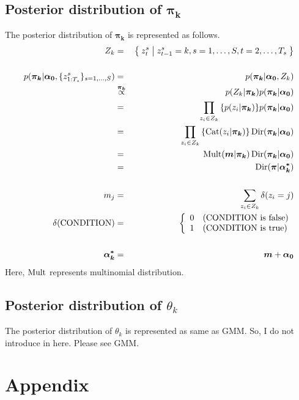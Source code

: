 \documentclass[a4paper]{article}
\DeclareMathOperator{\Cat}{\rm Cat}
\DeclareMathOperator{\Mult}{\rm Mult}
\DeclareMathOperator{\Dir}{\rm Dir}
\newcommand{\proptoas}[1]{\overset{#1}{\propto}}
\begin{document}
	\subsection{Posterior distribution of $\boldsymbol{\pi_k}$}
	The posterior distribution of $\boldsymbol{\pi_k}$ is represented as follows.
	\begin{eqnarray}
		Z_{k} &=& \Set{z^{s}_{t} | z^{s}_{t-1} = k, s=1,\ldots,S, t=2,\ldots,T_s} \nonumber \\
		\\
		p(\boldsymbol{\pi_k} | \boldsymbol{\alpha_0}, \{z_{1:T_s}^{s}\}_{s=1,\ldots,S})
		&=&
		p(\boldsymbol{\pi_k} | \boldsymbol{\alpha_0}, Z_{k}) \\
		&\proptoas{\boldsymbol{\pi_k}}&
		p(Z_{k} | \boldsymbol{\pi_k}) p(\boldsymbol{\pi_k} | \boldsymbol{\alpha_0})\\
		&=&
		\prod_{z_i \in Z_k}{\left\{ p(z_i | \boldsymbol{\pi_k}) \right\} } p(\boldsymbol{\pi_k} | \boldsymbol{\alpha_0})\\
		&=&
		\prod_{z_i \in Z_k}{\left\{ \Cat(z_i | \boldsymbol{\pi_k}) \right\} } \Dir(\boldsymbol{\pi_k} | \boldsymbol{\alpha_0})\\
		&=&
		\Mult(\boldsymbol{m} | \boldsymbol{\pi_k}) \Dir(\boldsymbol{\pi_k} | \boldsymbol{\alpha_0})\\
		&=&
		\Dir(\boldsymbol{\pi} | \boldsymbol{\alpha^*_k})\\
		\nonumber \\
		m_j &=& \sum_{z_i \in Z_k}{\delta(z_i = j)}\\
		\delta(\text{CONDITION})
		&=&
		\left\{
		\begin{array}{ll}
			0 & (\text{CONDITION is false})\\
			1 & (\text{CONDITION is true})
		\end{array}
		\right.\\
		\nonumber\\
		\boldsymbol{\alpha^*_k} &=& \boldsymbol{m} + \boldsymbol{\alpha_0}
	\end{eqnarray}
	Here, $\Mult$ represents multinomial distribution.

	\subsection{Posterior distribution of $\theta_k$}
	The posterior distribution of $\theta_k$ is represented as same as GMM.
	So, I do not introduce in here.
	Please see GMM.

	\newpage
	\appendix
	\section*{Appendix}
\end{document}
